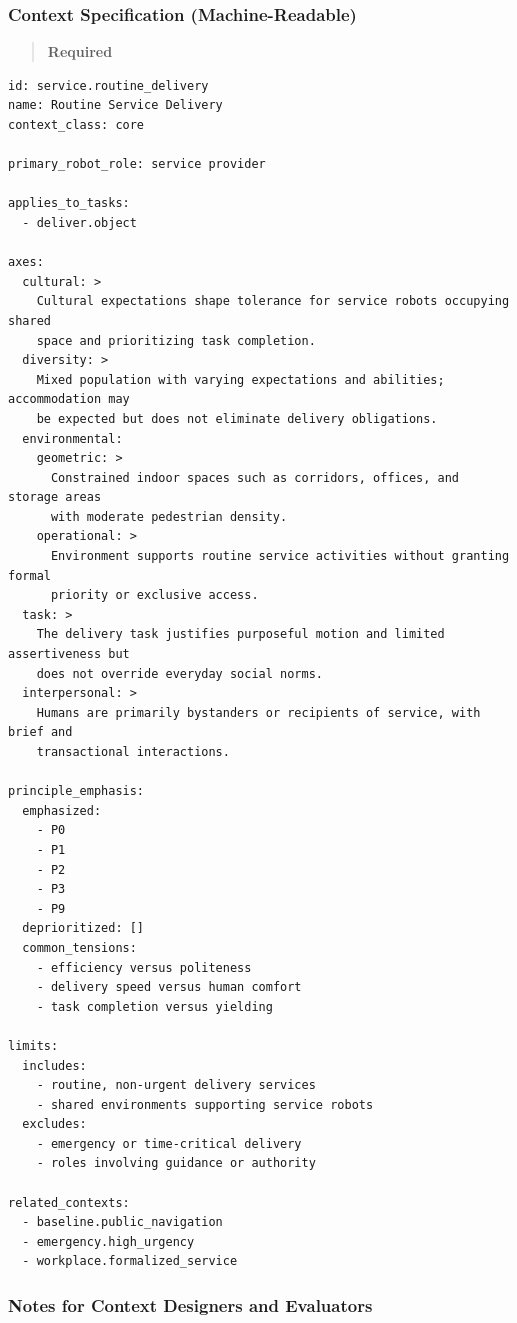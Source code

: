 \documentclass[utf8]{frontiers_suppmat} %
\begin{document}
\subsubsection{Context Specification
(Machine-Readable)}\label{context-specification-machine-readable}

\begin{quote}
\textbf{Required}
\end{quote}

\begin{lstlisting}[style=literatecard, label={context:routine}]
id: service.routine_delivery
name: Routine Service Delivery
context_class: core

primary_robot_role: service provider

applies_to_tasks:
  - deliver.object

axes:
  cultural: >
    Cultural expectations shape tolerance for service robots occupying shared
    space and prioritizing task completion.
  diversity: >
    Mixed population with varying expectations and abilities; accommodation may
    be expected but does not eliminate delivery obligations.
  environmental:
    geometric: >
      Constrained indoor spaces such as corridors, offices, and storage areas
      with moderate pedestrian density.
    operational: >
      Environment supports routine service activities without granting formal
      priority or exclusive access.
  task: >
    The delivery task justifies purposeful motion and limited assertiveness but
    does not override everyday social norms.
  interpersonal: >
    Humans are primarily bystanders or recipients of service, with brief and
    transactional interactions.

principle_emphasis:
  emphasized:
    - P0
    - P1
    - P2
    - P3
    - P9
  deprioritized: []
  common_tensions:
    - efficiency versus politeness
    - delivery speed versus human comfort
    - task completion versus yielding

limits:
  includes:
    - routine, non-urgent delivery services
    - shared environments supporting service robots
  excludes:
    - emergency or time-critical delivery
    - roles involving guidance or authority

related_contexts:
  - baseline.public_navigation
  - emergency.high_urgency
  - workplace.formalized_service
\end{lstlisting}

\subsubsection{Notes for Context Designers and
Evaluators}\label{notes-for-context-designers-and-evaluators}
\end{document}
